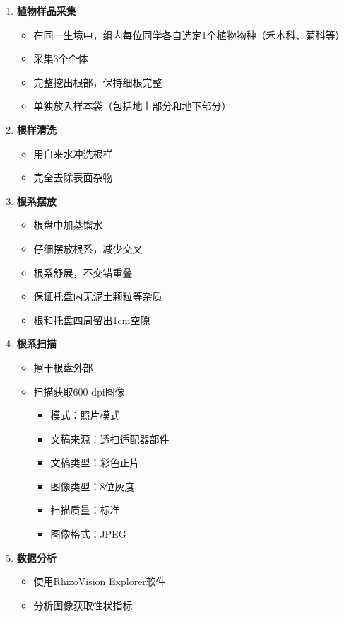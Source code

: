 \documentclass[10.5pt]{config}
\begin{document}
\begin{enumerate}
    \item \textbf{植物样品采集}
    \begin{itemize}
        \item 在同一生境中，组内每位同学各自选定1个植物物种（禾本科、菊科等）
        \item 采集3个个体
        \item 完整挖出根部，保持细根完整
        \item 单独放入样本袋（包括地上部分和地下部分）
    \end{itemize}
    
    \item \textbf{根样清洗}
    \begin{itemize}
        \item 用自来水冲洗根样
        \item 完全去除表面杂物
    \end{itemize}
    
    \item \textbf{根系摆放}
    \begin{itemize}
        \item 根盘中加蒸馏水
        \item 仔细摆放根系，减少交叉
        \item 根系舒展，不交错重叠
        \item 保证托盘内无泥土颗粒等杂质
        \item 根和托盘四周留出1cm空隙
    \end{itemize}
    
    \item \textbf{根系扫描}
    \begin{itemize}
        \item 擦干根盘外部
        \item 扫描获取600 dpi图像
        \begin{itemize}
            \item 模式：照片模式
            \item 文稿来源：透扫适配器部件
            \item 文稿类型：彩色正片
            \item 图像类型：8位灰度
            \item 扫描质量：标准
            \item 图像格式：JPEG
        \end{itemize}
    \end{itemize}
    
    \item \textbf{数据分析}
    \begin{itemize}
        \item 使用RhizoVision Explorer软件
        \item 分析图像获取性状指标
    \end{itemize}
    

\end{enumerate}
\end{document}
